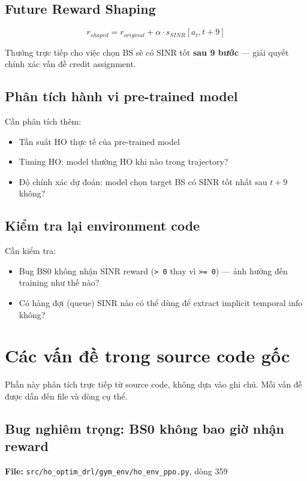 \documentclass[11pt]{article}
\begin{document}
\subsection{Future Reward Shaping}

\[
r_{shaped} = r_{original} + \alpha \cdot s_{SINR}[a_t, t+9]
\]

Thưởng trực tiếp cho việc chọn BS sẽ có SINR tốt \textbf{sau 9 bước} --- giải quyết chính xác vấn đề credit assignment.

\subsection{Phân tích hành vi pre-trained model}

Cần phân tích thêm:
\begin{itemize}
  \item Tần suất HO thực tế của pre-trained model
  \item Timing HO: model thường HO khi nào trong trajectory?
  \item Độ chính xác dự đoán: model chọn target BS có SINR tốt nhất sau $t+9$ không?
\end{itemize}

\subsection{Kiểm tra lại environment code}

Cần kiểm tra:
\begin{itemize}
  \item Bug BS0 không nhận SINR reward (\texttt{> 0} thay vì \texttt{>= 0}) --- ảnh hưởng đến training như thế nào?
  \item Có hàng đợi (queue) SINR nào có thể dùng để extract implicit temporal info không?
\end{itemize}

\section{Các vấn đề trong source code gốc}

Phần này phân tích trực tiếp từ source code, không dựa vào ghi chú. Mỗi vấn đề được dẫn đến file và dòng cụ thể.

\subsection{Bug nghiêm trọng: BS0 không bao giờ nhận reward}

\textbf{File:} \texttt{src/ho\_optim\_drl/gym\_env/ho\_env\_ppo.py}, dòng 359
\end{document}
